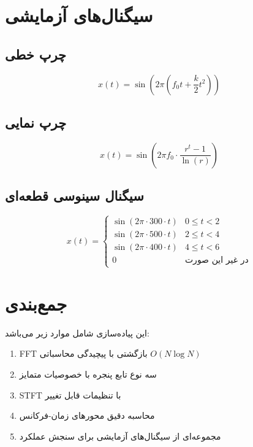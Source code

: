 \documentclass{article}
\begin{document}
\begin{RTL}
\section{سیگنال‌های آزمایشی}

\subsection{چرپ خطی}
\[
x(t) = \sin\left(2\pi(f_0 t + \frac{k}{2}t^2)\right)
\]

\subsection{چرپ نمایی}
\[
x(t) = \sin\left(2\pi f_0 \cdot \frac{r^t - 1}{\ln(r)}\right)
\]

\subsection{سیگنال سینوسی قطعه‌ای}
\[
x(t) = \begin{cases}
\sin(2\pi \cdot 300 \cdot t) & 0 \leq t < 2 \\
\sin(2\pi \cdot 500 \cdot t) & 2 \leq t < 4 \\
\sin(2\pi \cdot 400 \cdot t) & 4 \leq t < 6 \\
0 & \text{در غیر این صورت}
\end{cases}
\]

\section{جمع‌بندی}

این پیاده‌سازی شامل موارد زیر می‌باشد:
\begin{enumerate}[label=\alph*)]
\item FFT بازگشتی با پیچیدگی محاسباتی $O(N \log N)$
\item سه نوع تابع پنجره با خصوصیات متمایز
\item STFT با تنظیمات قابل تغییر
\item محاسبه دقیق محورهای زمان-فرکانس
\item مجموعه‌ای از سیگنال‌های آزمایشی برای سنجش عملکرد
\end{enumerate}

    
\end{RTL}
\end{document}
